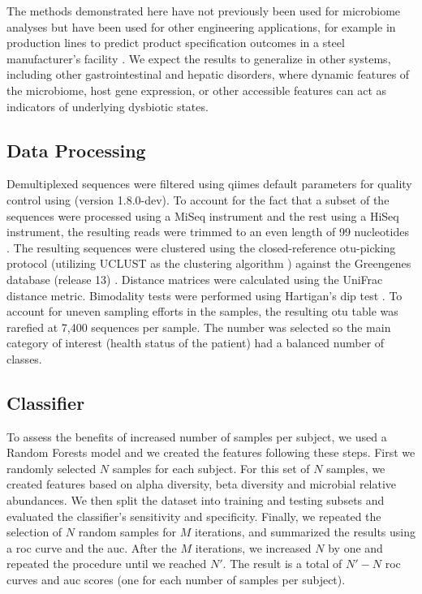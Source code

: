 The methods demonstrated here have not previously been used for microbiome analyses but have been used for other engineering applications, for example in production lines to predict product specification outcomes in a steel manufacturer's facility \cite{RN4216}. We expect the results to generalize in other systems, including other gastrointestinal and hepatic disorders, where dynamic features of the microbiome, host gene expression, or other accessible features can act as indicators of underlying dysbiotic states.

\subsection{Data Processing}

Demultiplexed sequences were filtered using \glspl{qiime} \cite{RN110} default parameters for quality control using (version 1.8.0-dev). To account for the fact that a subset of the sequences were processed using a MiSeq instrument and the rest using a HiSeq instrument, the resulting reads were trimmed to an even length of 99 nucleotides \cite{RN4221, RN4222}. The resulting sequences were clustered using the closed-reference \gls{otu}-picking protocol (utilizing UCLUST as the clustering algorithm \cite{RN3776}) against the Greengenes database (release 13) \cite{RN165}. Distance matrices were calculated using the UniFrac \cite{RN3770} distance metric. Bimodality tests were performed using Hartigan's dip test \cite{RN4017}. To account for uneven sampling efforts in the samples, the resulting \gls{otu} table was rarefied at 7,400 sequences per sample. The number was selected so the main category of interest (health status of the patient) had a balanced number of classes.

\subsection{Classifier}

To assess the benefits of increased number of samples per subject, we used a Random Forests \cite{RN4205} model and we created the features following these steps. First we randomly selected $N$ samples for each subject.  For this set of $N$ samples, we created features based on alpha diversity, beta diversity and microbial relative abundances. We then split the dataset into training and testing subsets and evaluated the classifier's sensitivity and specificity. Finally, we repeated the selection of $N$ random samples for $M$ iterations, and summarized the results using a \gls{roc} curve and the \gls{auc}. After the $M$ iterations, we increased $N$ by one and repeated the procedure until we reached $N'$. The result is a total of $N'-N$ \gls{roc} curves and \gls{auc} scores (one for each number of samples per subject).


